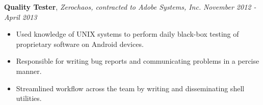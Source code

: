\documentclass[9pt]{article}
\newenvironment{changemargin}[2]{%
  \begin{list}{}{%
    \setlength{\topsep}{0pt}%
    \setlength{\leftmargin}{#1}%
    \setlength{\rightmargin}{#2}%
    \setlength{\listparindent}{\parindent}%
    \setlength{\itemindent}{\parindent}%
    \setlength{\parsep}{\parskip}%
  }%
  \item[]}{\end{list}
}
\newenvironment{body} {
	\vspace*{-16pt}
	\begin{changemargin}{-0.25in}{-0.5in}
  }	
	{\end{changemargin}
}
\begin{document}
\begin{body}
	
	
	\textbf{Quality Tester}, \emph{Zerochaos, contracted to Adobe Systems, Inc.} \hfill \emph{November 2012 - April 2013}\\
	\vspace*{-4pt}
	\begin{itemize} \itemsep -0pt  %
		\item Used knowledge of UNIX systems to perform daily black-box testing of proprietary software on Android devices.
		\item Responsible for writing bug reports and communicating problems in a percise manner.
		\item Streamlined workflow across the team by writing and disseminating shell utilities.
	\end{itemize}
\begin{comment}
	\textbf{Senior Counselor}, \emph{Milton Collins Day Camp} \hfill \emph{Summer 2012}\\
	\vspace*{-4pt}
	\begin{itemize} \itemsep -0pt  %
		\item Responsible for groups of 2nd-6th graders and for creating a safe, spirited, and fun experience. 
		\item Worked with supervisors and fellow staff in ensuring management of children, supplies, and instruction.
		\item Helped lead camp-wide multi-day event, radically different from day-to-day activities. %
	\end{itemize}
\end{comment}


\end{body}
\end{document}
